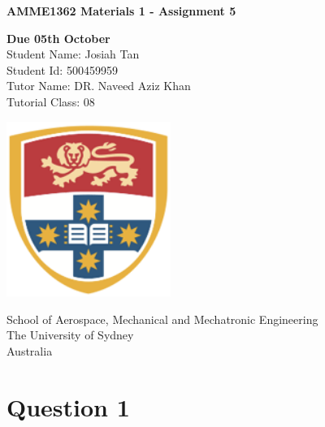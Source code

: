 \documentclass[11]{article}
\begin{document}
\begin{titlepage}
	\begin{center}
		\vspace*{1cm}

		\Huge
		\textbf{AMME1362 Materials 1 - Assignment 5}

		\vspace{0.5cm}
		\LARGE
		\textbf{Due 05th October} \\
		Student Name: Josiah Tan\\
		Student Id:  500459959\\
		Tutor Name: DR. Naveed Aziz Khan\\
		Tutorial Class: 08

		\vspace{1.5cm}

		\large
		\vspace{1cm}

		\vfill

		\vspace{0.4cm}

		\includegraphics[width=0.4\textwidth]{photos/university-of-sydney.png}

		\Large
		School of Aerospace, Mechanical and Mechatronic Engineering\\
		The University of Sydney\\
		Australia\\

		\newpage
		\tableofcontents %
	\end{center}
\end{titlepage}

\newpage
\large
{}
\section{Question 1}


\cite{newton}



% 
% 
\newpage
\end{document}

